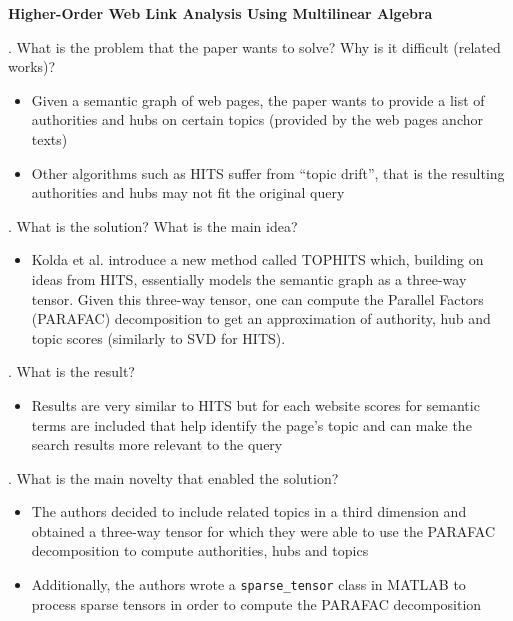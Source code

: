 \documentclass[12pt]{article}
\begin{document}
 

{\Large\centering
    \textbf{Higher-Order Web Link Analysis Using Multilinear Algebra}
\par}

\bigskip

. What is the problem that the paper wants to solve? Why is it difficult (related works)?

\begin{itemize}
    \item Given a semantic graph of web pages, the paper wants to provide a list of authorities and hubs on certain topics (provided by the web pages anchor texts)
    \item Other algorithms such as HITS suffer from ``topic drift'', that is the resulting authorities and hubs may not fit the original query
\end{itemize}

. What is the solution? What is the main idea?

\begin{itemize}
    \item Kolda et al. introduce a new method called TOPHITS which, building on ideas from HITS, essentially models the semantic graph as a three-way tensor. Given this three-way tensor, one can compute the Parallel Factors (PARAFAC) decomposition to get an approximation of authority, hub and topic scores (similarly to SVD for HITS).
    
\end{itemize}

. What is the result?

\begin{itemize}
    \item Results are very similar to HITS but for each website scores for semantic terms are included that help identify the page's topic and can make the search results more relevant to the query
\end{itemize}

. What is the main novelty that enabled the solution?

\begin{itemize}
    \item The authors decided to include related topics in a third dimension and obtained a three-way tensor for which they were able to use the PARAFAC decomposition to compute authorities, hubs and topics
    \item Additionally, the authors wrote a \texttt{sparse\_tensor} class in MATLAB to process sparse tensors in order to compute the PARAFAC decomposition
\end{itemize}
\end{document}
